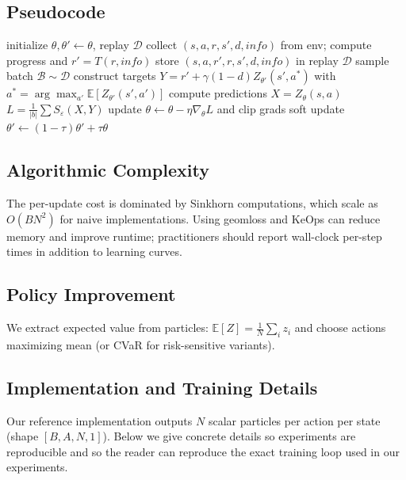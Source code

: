 \documentclass[10pt,twocolumn]{article}
\begin{document}
\subsection{Pseudocode}
\begin{algorithm}[h!]
\caption{MaxSink training loop (single process)}
\begin{algorithmic}[1]
\State initialize $\theta,\theta'\gets \theta$, replay $\mathcal{D}$
  \State collect $(s,a,r,s',d,info)$ from env; compute progress and $r'=T(r,info)$
  \State store $(s,a,r',r,s',d,info)$ in replay $\mathcal{D}$
    \State sample batch $\mathcal{B}\sim\mathcal{D}$
      \State construct targets $Y = r' + \gamma (1-d) Z_{\theta'}(s', a^*)$ with $a^*=\arg\max_{a'}\mathbb{E}[Z_{\theta'}(s',a')]$
      \State compute predictions $X = Z_\theta(s,a)$
      \State $L = \frac{1}{|b|}\sum S_\varepsilon(X,Y)$
      \State update $\theta \leftarrow \theta - \eta \nabla_\theta L$ and clip grads
    \EndFor
    \State soft update $\theta'\leftarrow (1-\tau)\theta' + \tau\theta$
  \EndIf
\EndFor
\end{algorithmic}
\label{alg:maxsink_simple}
\end{algorithm}

\subsection{Algorithmic Complexity}
The per-update cost is dominated by Sinkhorn computations, which scale as $O(BN^2)$ for naive implementations. Using geomloss and KeOps can reduce memory and improve runtime; practitioners should report wall-clock per-step times in addition to learning curves.

\subsection{Policy Improvement}
We extract expected value from particles: $\mathbb{E}[Z]=\frac{1}{N}\sum_i z_i$ and choose actions maximizing mean (or CVaR for risk-sensitive variants).

\subsection{Implementation and Training Details}
Our reference implementation outputs $N$ scalar particles per action per state (shape $[B,A,N,1]$). Below we give concrete details so experiments are reproducible and so the reader can reproduce the exact training loop used in our experiments.
\end{document}
